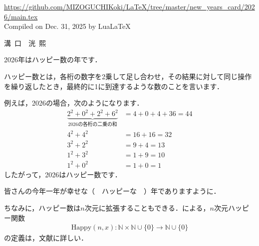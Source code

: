\documentclass[twocolumn]{jlreq}
\begin{document}
\vspace{-.3cm}
\begin{framed}
    \vspace{2.5cm}
\end{framed}
\noindent\scriptsize{\url{https://github.com/MIZOGUCHIKoki/LaTeX/tree/master/new_years_card/2026/main.tex}\\
    \hfill Compiled on Dec. 31, 2025 by Lua\LaTeX}
\vspace{.5cm}
\parbox{.9\linewidth}{
    \setlength{\baselineskip}{5pt}
    {\fontsize{5px}{0px}\selectfont\noindent}
    \vspace{.3cm}
    \begin{center}
        {\LARGE 溝\ 口\ \  洸\ 熙}
    \end{center}
    \vspace{.3cm}
}
\newpage
\rmfamily
2026年はハッピー数の年です．\par
ハッピー数とは，各桁の数字を2乗して足し合わせ，その結果に対して同じ操作を繰り返したとき，最終的に1に到達するような数のことを言います．\par
例えば，2026の場合，次のようになります．
\begin{align*}
    \underbrace{2^2 + 0^2 + 2^2 + 6^2}_{2026の各桁の二乗の和} & = 4 + 0 + 4 + 36 = 44 \\
    4^2 + 4^2                                         & = 16 + 16 = 32        \\
    3^2 + 2^2                                         & = 9 + 4 = 13          \\
    1^2 + 3^2                                         & = 1 + 9 = 10          \\
    1^2 + 0^2                                         & = 1 + 0 = 1
\end{align*}
したがって，2026はハッピー数です．\par
皆さんの今年一年が幸せな（\faHandPeace[regular]~~ハッピーな~~\faHandPeace[regular]）年でありますように．

ちなみに，ハッピー数は\(n\)次元に拡張することもできる．\citeauthor{1050564288795241088}による，\(n\)次元ハッピー関数
\begin{align*}
    \mathrm{Happy}(n,x):\mathbb{N}\times \mathbb{N}\cup\{0\}\rightarrow \mathbb{N}\cup\{0\}
\end{align*}
の定義は，文献\cite{1050564288795241088}に詳しい．

\noindent\parbox{\linewidth}{\tiny\cite{1050564288795241088}}
\end{document}
